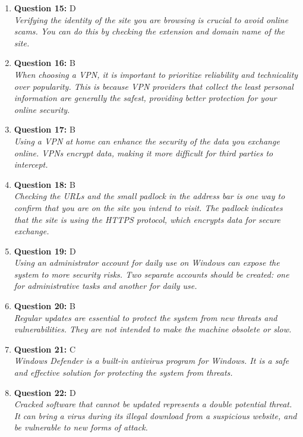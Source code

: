 \documentclass[12pt,a4paper]{article}
\begin{document}
\begin{enumerate}
\item \textbf{Question 15:} D
\\ \textit{Verifying the identity of the site you are browsing is crucial to avoid online scams. You can do this by checking the extension and domain name of the site.}

\item \textbf{Question 16:} B
\\ \textit{When choosing a VPN, it is important to prioritize
reliability and technicality over popularity. This is
because VPN providers that collect the least personal
information are generally the safest, providing better
protection for your online security.}

\item \textbf{Question 17:} B
\\ \textit{Using a VPN at home can enhance the security of the data you exchange online. VPNs encrypt data, making it more difficult for third parties to intercept.}

\item \textbf{Question 18:} B
\\ \textit{Checking the URLs and the small padlock in the address bar
is one way to confirm that you are on the site you intend
to visit. The padlock indicates that the site is using the
HTTPS protocol, which encrypts data for secure exchange.}

\item \textbf{Question 19:} D
\\ \textit{Using an administrator account for daily use on Windows can expose the system to more security risks. Two separate accounts should be created: one for administrative tasks and another for daily use.}

\item \textbf{Question 20:} B
\\ \textit{Regular updates are essential to protect the system from
new threats and vulnerabilities. They are not intended to
make the machine obsolete or slow.}

\item \textbf{Question 21:} C
\\ \textit{Windows Defender is a built-in antivirus program for Windows. It is a safe and effective solution for protecting the system from threats.}

\item \textbf{Question 22:} D
\\ \textit{Cracked software that cannot be updated represents a double potential threat. It can bring a virus during its illegal download from a suspicious website, and be vulnerable to new forms of attack.}


\end{enumerate}
\end{document}
